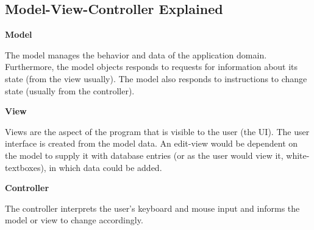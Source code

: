 \subsection{Model-View-Controller Explained}

\noindent
\textbf{Model}

\noindent
The model manages the behavior and data of the application domain. Furthermore, the model objects responds to requests for information about its state (from the view usually). The model also responds to instructions to change state (usually from the controller)\cite{modelviewcontroller}.

\vspace{5 mm}
\noindent
\textbf{View}

\noindent
Views are the aspect of the program that is visible to the user (the UI)\cite{mvcasp}. The user interface is created from the model data\cite{mvcasp}. An edit-view would be dependent on the model to supply it with database entries (or as the user would view it, white-textboxes), in which data could be added. 

\vspace{5 mm}
\noindent
\textbf{Controller}

\noindent
The controller interprets the user's keyboard and mouse input and informs the model or view to change accordingly\cite{mvcasp}.